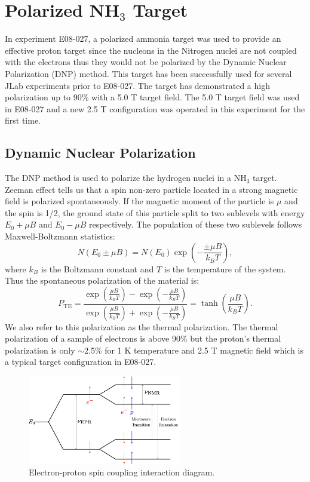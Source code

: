 \section{\texorpdfstring{Polarized NH${}_3$ Target}{Polarized NH3 Target}}
\label{C5S3}

In experiment E08-027, a polarized ammonia target was used to provide an effective proton target since the nucleons in the Nitrogen nuclei are not coupled with the electrons thus they would not be polarized by the Dynamic Nuclear Polarization (DNP) method. This target has been successfully used for several JLab experiments prior to E08-027. The target has demonstrated a high polarization up to 90\% with a 5.0 T target field. The 5.0 T target field was used in E08-027 and a new 2.5 T configuration was operated in this experiment for the first time.

\subsection{Dynamic Nuclear Polarization}
\label{C5S3SS1}

The DNP method is used to polarize the hydrogen nuclei in a NH${}_3$ target. Zeeman effect tells us that a spin non-zero particle located in a strong magnetic field is polarized spontaneously. If the magnetic moment of the particle is $\mu$ and the spin is 1/2, the ground state of this particle split to two sublevels with energy $E_0+\mu B$ and $E_0-\mu B$ respectively. The population of these two sublevels follows Maxwell-Boltzmann statistics:
\begin{equation} \label{C5S3SS1E1}
N(E_0\pm\mu B) = N(E_0)\exp(-\frac{\pm\mu B}{k_B T}),
\end{equation}
where $k_B$ is the Boltzmann constant and $T$ is the temperature of the system. Thus the spontaneous polarization of the material is:
\begin{equation} \label{C5S3SS1E2}
P_{\mathrm{TE}} = \frac{\exp(\frac{\mu B}{k_BT})-\exp(-\frac{\mu B}{k_BT})}{\exp(\frac{\mu B}{k_BT})+\exp(-\frac{\mu B}{k_BT})} = \tanh(\frac{\mu B}{k_B T}).
\end{equation}
We also refer to this polarization as the thermal polarization. The thermal polarization of a sample of electrons is above 90\% but the proton's thermal polarization is only $\sim$2.5\% for 1 K temperature and 2.5 T magnetic field which is a typical target configuration in E08-027.

\begin{figure}[b!]
  \centering
  \includegraphics[width=0.6\textwidth]{figs/DNP.png}
  \caption[Electron-proton spin coupling interaction diagram.]{Electron-proton spin coupling interaction diagram. \label{C5S3SS1F1}}
\end{figure}

